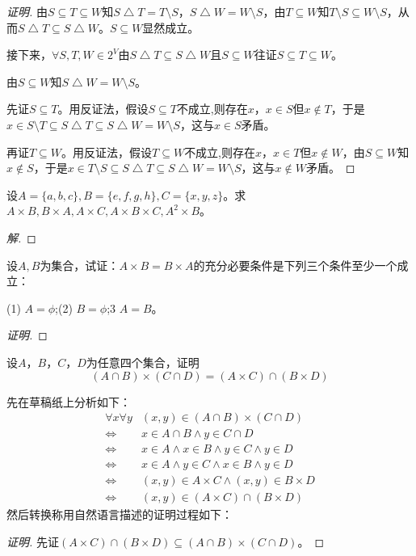 \documentclass{article}
\begin{document}
\begin{CJK}{UTF8}{gbsn}
\begin{proof}[证明]
  由$S \subseteq T \subseteq W$知$S \bigtriangleup T = T\setminus S$，$S \bigtriangleup W = W\setminus S$，由$T\subseteq W$知$T\setminus S \subseteq W\setminus S$，从而$S \bigtriangleup T \subseteq S \bigtriangleup W$。$S \subseteq W$显然成立。

  接下来，$\forall S,T,W \in 2^V$由$S \bigtriangleup T \subseteq S \bigtriangleup W$且$S \subseteq W$往证$S \subseteq T \subseteq W$。

  由$S\subseteq W$知$S\bigtriangleup W = W\setminus S$。
  
  先证$S\subseteq T$。用反证法，假设$S\subseteq T$不成立,则存在$x$，$x\in S$但$x \notin T$，于是$x\in S\setminus T\subseteq S\bigtriangleup T \subseteq S\bigtriangleup W = W\setminus S$，这与$x\in S$矛盾。

  再证$T\subseteq W$。用反证法，假设$T\subseteq W$不成立,则存在$x$，$x\in T$但$x \notin W$，由$S\subseteq W$知$x\notin S$，于是$x \in T\setminus S \subseteq S\bigtriangleup T \subseteq S\bigtriangleup W = W\setminus S$，这与$x\notin W$矛盾。
\end{proof}

\begin{Exercise}
  设$A=\{a,b,c\}, B=\{e,f,g,h\}, C=\{x,y,z\}$。求$A\times B, B\times A, A\times C, A\times B \times C, A^2\times B$。
\end{Exercise}
\begin{proof}[解]
\end{proof}
\begin{Exercise}
  设$A,B$为集合，试证：$A\times B= B\times A$的充分必要条件是下列三个条件至少一个成立：

  (1) $A=\phi$;(2) $B=\phi$;3 $A=B$。
\end{Exercise}
\begin{proof}[证明]
\end{proof}
\begin{Exercise}
  设$A$，$B$，$C$，$D$为任意四个集合，证明
  \[(A\cap B) \times (C \cap D) = (A\times C)\cap (B \times D)\]
\end{Exercise}
先在草稿纸上分析如下：
\begin{equation*}
  \begin{split}
  \forall x \forall y&(x,y) \in (A\cap B) \times (C \cap D)\\
  \Leftrightarrow&x \in A \cap B \land y \in C \cap D\\
  \Leftrightarrow&x \in A \land x \in B \land y \in C \land y \in D\\
  \Leftrightarrow&x \in A \land y \in C \land x \in B \land y \in D\\
  \Leftrightarrow&(x,y) \in A \times C \land (x,y) \in B \times D\\
  \Leftrightarrow&(x,y) \in (A\times C)\cap (B \times D)
  \end{split}
\end{equation*}
然后转换称用自然语言描述的证明过程如下：
\begin{proof}[证明]
  先证$(A\times C)\cap (B \times D)\subseteq (A\cap B) \times (C \cap D)$。


\end{proof}
\end{CJK}
\end{document}
